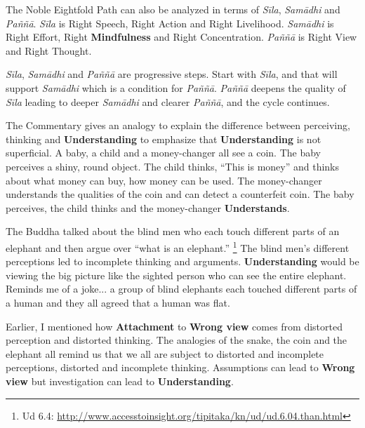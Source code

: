 The Noble Eightfold Path can also be analyzed in terms of \textit{Sīla}, \textit{Samādhi} and \textit{Paññā}. \textit{Sīla} is Right Speech, Right Action and Right Livelihood. \textit{Samādhi} is Right Effort, Right \textbf{Mindfulness} and Right Concentration. \textit{Paññā} is Right View and Right Thought.

\textit{Sīla}, \textit{Samādhi} and \textit{Paññā} are progressive steps. Start with \textit{Sīla}, and that will support \textit{Samādhi} which is a condition for \textit{Paññā}. \textit{Paññā} deepens the quality of \textit{Sīla} leading to deeper \textit{Samādhi} and clearer \textit{Paññā}, and the cycle continues.

The Commentary gives an analogy to explain the difference between perceiving, thinking and \textbf{Understanding} to emphasize that \textbf{Understanding} is not superficial. A baby, a child and a money-changer all see a coin. The baby perceives a shiny, round object. The child thinks, “This is money” and thinks about what money can buy, how money can be used. The money-changer understands the qualities of the coin and can detect a counterfeit coin. The baby perceives, the child thinks and the money-changer \textbf{Understands}.

The Buddha talked about the blind men who each touch different parts of an elephant and then argue over “what is an elephant.” \footnote{Ud 6.4: \url{http://www.accesstoinsight.org/tipitaka/kn/ud/ud.6.04.than.html}} The blind men’s different perceptions led to incomplete thinking and arguments. \textbf{Understanding} would be viewing the big picture like the sighted person who can see the entire elephant. Reminds me of a joke... a group of blind elephants each touched different parts of a human and they all agreed that a human was flat.

Earlier, I mentioned how \textbf{Attachment} to \textbf{Wrong view} comes from distorted perception and distorted thinking. The analogies of the snake, the coin and the elephant all remind us that we all are subject to distorted and incomplete perceptions, distorted and incomplete thinking. Assumptions can lead to \textbf{Wrong view} but investigation can lead to \textbf{Understanding}.

